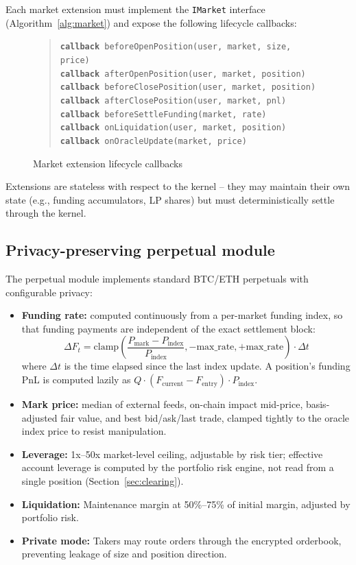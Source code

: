 \documentclass[11pt,a4paper]{article}
\begin{document}
Each market extension must implement the \texttt{IMarket} interface (Algorithm~\ref{alg:market}) and expose the following lifecycle callbacks:

\begin{figure}[h]
  \caption{Market extension lifecycle callbacks}
  \label{alg:hooks}
  \begin{quote}
  \texttt{\textbf{callback} beforeOpenPosition(user, market, size, price)} \\
  \texttt{\textbf{callback} afterOpenPosition(user, market, position)} \\
  \texttt{\textbf{callback} beforeClosePosition(user, market, position)} \\
  \texttt{\textbf{callback} afterClosePosition(user, market, pnl)} \\
  \texttt{\textbf{callback} beforeSettleFunding(market, rate)} \\
  \texttt{\textbf{callback} onLiquidation(user, market, position)} \\
  \texttt{\textbf{callback} onOracleUpdate(market, price)}
  \end{quote}
\end{figure}

Extensions are stateless with respect to the kernel -- they may maintain their own state (e.g., funding accumulators, LP shares) but must deterministically settle through the kernel.

\subsection{Privacy-preserving perpetual module}

The perpetual module implements standard BTC/ETH perpetuals with configurable privacy:
\begin{itemize}
  \item \textbf{Funding rate:} computed continuously from a per-market funding index, so that funding payments are independent of the exact settlement block:
  \[
  \Delta F_t = \text{clamp}\left(\frac{P_{\text{mark}} - P_{\text{index}}}{P_{\text{index}}}, -\text{max\_rate}, +\text{max\_rate}\right) \cdot \Delta t
  \]
  where $\Delta t$ is the time elapsed since the last index update. A position's funding PnL is computed lazily as $Q \cdot (F_{\text{current}} - F_{\text{entry}}) \cdot P_{\text{index}}$.
  \item \textbf{Mark price:} median of external feeds, on-chain impact mid-price, basis-adjusted fair value, and best bid/ask/last trade, clamped tightly to the oracle index price to resist manipulation.
  \item \textbf{Leverage:} 1x--50x market-level ceiling, adjustable by risk tier; effective account leverage is computed by the portfolio risk engine, not read from a single position (Section~\ref{sec:clearing}).
  \item \textbf{Liquidation:} Maintenance margin at 50\%--75\% of initial margin, adjusted by portfolio risk.
  \item \textbf{Private mode:} Takers may route orders through the encrypted orderbook, preventing leakage of size and position direction.
\end{itemize}
\end{document}
